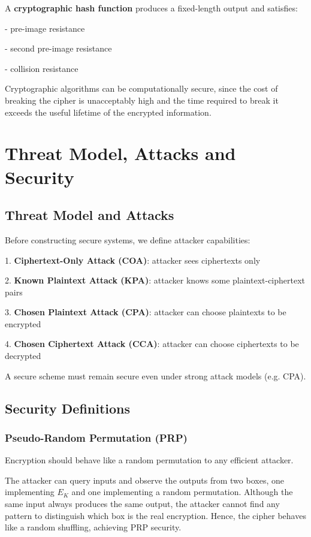 A \textbf{cryptographic hash function} produces a fixed-length output and satisfies:

- pre-image resistance

- second pre-image resistance

- collision resistance

Cryptographic algorithms can be computationally secure, since the cost of breaking the cipher is unacceptably high and the time required to break it exceeds the useful lifetime of the encrypted information.

\section{Threat Model, Attacks and Security}

\subsection{Threat Model and Attacks}

Before constructing secure systems, we define attacker capabilities:

1. \textbf{Ciphertext-Only Attack (COA)}: attacker sees ciphertexts only

2. \textbf{Known Plaintext Attack (KPA)}: attacker knows some plaintext-ciphertext pairs

3. \textbf{Chosen Plaintext Attack (CPA)}: attacker can choose plaintexts to be encrypted

4. \textbf{Chosen Ciphertext Attack (CCA)}: attacker can choose ciphertexts to be decrypted

A secure scheme must remain secure even under strong attack models (e.g. CPA).

\subsection{Security Definitions}

\subsubsection{Pseudo-Random Permutation (PRP)}
Encryption should behave like a random permutation to any efficient attacker.

\begin{intuition}
  The attacker can query inputs and observe the outputs from two boxes, one implementing \(E_K\) and one implementing a random permutation. Although the same input always produces the same output, the attacker cannot find any pattern to distinguish which box is the real encryption. Hence, the cipher behaves like a random shuffling, achieving PRP security.
\end{intuition}


